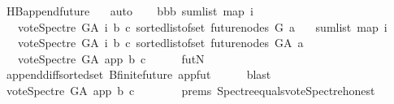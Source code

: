 \begin{isabellebody}
\ HB{}{\isachardot}{\kern0pt}append{\isacharunderscore}{\kern0pt}future{}\ {}{\isacharparenleft}{\kern0pt}{}{\isacharparenright}{\kern0pt}\ \isamarkupfalse%
\ auto\isanewline
\ \ \isamarkupfalse%
\ bbb{\isacharcolon}{\kern0pt}\ {\isachardoublequoteopen}sum{\isacharunderscore}{\kern0pt}list\ {\isacharparenleft}{\kern0pt}map\ {\isacharparenleft}{\kern0pt}{\isasymlambda}i{\isachardot}{\kern0pt}\isanewline
\ \ \ {\isacharparenleft}{\kern0pt}vote{\isacharunderscore}{\kern0pt}Spectre\ G{\isacharunderscore}{\kern0pt}A\ i\ b\ c{\isacharparenright}{\kern0pt}{\isacharparenright}{\kern0pt}\ {\isacharparenleft}{\kern0pt}sorted{\isacharunderscore}{\kern0pt}list{\isacharunderscore}{\kern0pt}of{\isacharunderscore}{\kern0pt}set\ {\isacharparenleft}{\kern0pt}future{\isacharunderscore}{\kern0pt}nodes\ G\ a{\isacharparenright}{\kern0pt}{\isacharparenright}{\kern0pt}{\isacharparenright}{\kern0pt}\isanewline
\ \ {\isacharequal}{\kern0pt}\ sum{\isacharunderscore}{\kern0pt}list\ {\isacharparenleft}{\kern0pt}map\ {\isacharparenleft}{\kern0pt}{\isasymlambda}i{\isachardot}{\kern0pt}\isanewline
\ \ \ {\isacharparenleft}{\kern0pt}vote{\isacharunderscore}{\kern0pt}Spectre\ G{\isacharunderscore}{\kern0pt}A\ i\ b\ c{\isacharparenright}{\kern0pt}{\isacharparenright}{\kern0pt}\ {\isacharparenleft}{\kern0pt}sorted{\isacharunderscore}{\kern0pt}list{\isacharunderscore}{\kern0pt}of{\isacharunderscore}{\kern0pt}set\ {\isacharparenleft}{\kern0pt}future{\isacharunderscore}{\kern0pt}nodes\ G{\isacharunderscore}{\kern0pt}A\ a{\isacharparenright}{\kern0pt}{\isacharparenright}{\kern0pt}{\isacharparenright}{\kern0pt}\isanewline
\ \ {\isacharminus}{\kern0pt}\ {\isacharparenleft}{\kern0pt}vote{\isacharunderscore}{\kern0pt}Spectre\ G{\isacharunderscore}{\kern0pt}A\ app\ b\ c{\isacharparenright}{\kern0pt}{\isachardoublequoteclose}\isanewline
\ \ \ \ \isamarkupfalse%
\ futN\ \isanewline
\ \ \ \ \isamarkupfalse%
\ append{\isacharunderscore}{\kern0pt}diff{\isacharunderscore}{\kern0pt}sorted{\isacharunderscore}{\kern0pt}set\ B{}{\isachardot}{\kern0pt}finite{\isacharunderscore}{\kern0pt}future\ appfut\isanewline
\ \ \ \ \isamarkupfalse%
\ blast\ \isanewline
\ \ \isamarkupfalse%
\ {\isachardoublequoteopen}vote{\isacharunderscore}{\kern0pt}Spectre\ G{\isacharunderscore}{\kern0pt}A\ app\ b\ c\ {\isacharequal}{\kern0pt}\ {}{\isachardoublequoteclose}\isanewline
\ \ \ \ \isamarkupfalse%
\ {\isachardoublequoteopen}{}{\isachardot}{\kern0pt}prems{\isachardoublequoteclose}\ Spectre{\isacharunderscore}{\kern0pt}equals{\isacharunderscore}{\kern0pt}vote{\isacharunderscore}{\kern0pt}Spectre{\isacharunderscore}{\kern0pt}honest\isanewline

\end{isabellebody}
